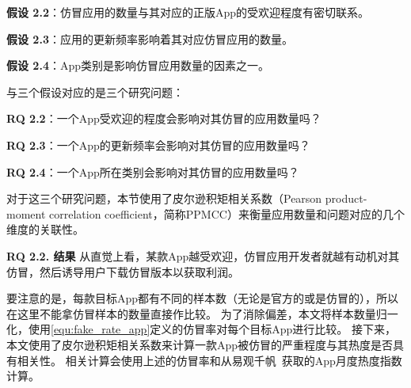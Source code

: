 {\bf 假设 2.2}：仿冒应用的数量与其对应的正版App的受欢迎程度有密切联系。

{\bf 假设 2.3}：应用的更新频率影响着其对应仿冒应用的数量。

{\bf 假设 2.4}：App类别是影响仿冒应用数量的因素之一。

与三个假设对应的是三个研究问题：

{\bf RQ 2.2}：一个App受欢迎的程度会影响对其仿冒的应用数量吗？

{\bf RQ 2.3}：一个App的更新频率会影响对其仿冒的应用数量吗？

{\bf RQ 2.4}：一个App所在类别会影响对其仿冒的应用数量吗？

对于这三个研究问题，本节使用了皮尔逊积矩相关系数（Pearson product-moment correlation coefficient，简称PPMCC）来衡量应用数量和问题对应的几个维度的关联性。

{\bf RQ 2.2. 结果}
从直觉上看，某款App越受欢迎，仿冒应用开发者就越有动机对其仿冒，然后诱导用户下载仿冒版本以获取利润。

要注意的是，每款目标App都有不同的样本数（无论是官方的或是仿冒的），所以在这里不能拿仿冒样本的数量直接作比较。
为了消除偏差，本文将样本数量归一化，使用\autoref{equ:fake_rate_app}定义的仿冒率对每个目标App进行比较。
接下来，本文使用了皮尔逊积矩相关系数来计算一款App被仿冒的严重程度与其热度是否具有相关性。
相关计算会使用上述的仿冒率和从易观千帆~\cite{yiguanqianfan}获取的App月度热度指数计算。

